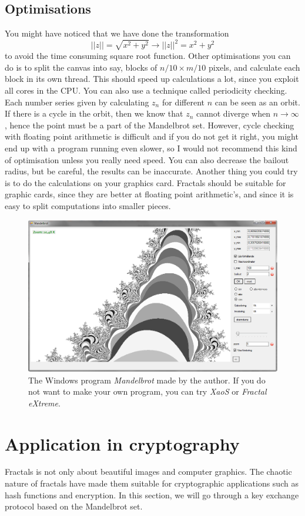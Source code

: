 \documentclass{article}
\begin{document}
\subsection{Optimisations}
You might have noticed that we have done the transformation \[||z||=\sqrt{x^2+y^2} \to ||z||^2=x^2+y^2\] to avoid the time consuming square root function. Other optimisations you can do is to split the canvas into say, blocks of $n/10\times m/10$ pixels, and calculate each block in its own thread. This should speed up calculations a lot, since you exploit all cores in the CPU. You can also use a technique called periodicity checking. Each number series given by calculating $z_{n}$ for different $n$ can be seen as an orbit. If there is a cycle in the orbit, then we know that $z_{n}$ cannot diverge when $n \to \infty$, hence the point must be a part of the Mandelbrot set. However, cycle checking with floating point arithmetic is difficult and if you do not get it right, you might end up with a program running even slower, so I would not recommend this kind of optimisation unless you really need speed\cite{xaos}. You can also decrease the bailout radius, but be careful, the results can be inaccurate. Another thing you could try is to do the calculations on your graphics card. Fractals should be suitable for graphic cards, since they are better at floating point arithmetic's, and since it is easy to split computations into smaller pieces.
\begin{figure}[hb]
\centering
\includegraphics[width=120mm]{program.png}
\caption{The Windows program \textit{Mandelbrot} made by the author. If you do not want to make your own program, you can try \textit{XaoS} or \textit{Fractal eXtreme}.}
\end{figure}
\section{Application in cryptography}
Fractals is not only about beautiful images and computer graphics. The chaotic nature of fractals have made them suitable for cryptographic applications such as hash functions and encryption. In this section, we will go through a key exchange protocol based on the Mandelbrot set.
\end{document}
